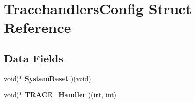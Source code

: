 \hypertarget{struct_tracehandlers_config}{}\section{Tracehandlers\+Config Struct Reference}
\label{struct_tracehandlers_config}
\subsection*{Data Fields}
\begin{DoxyCompactItemize}
\item
\hypertarget{struct_tracehandlers_config_a8a207cd3094ad3179b990c1dd4be8417}{}\label{struct_tracehandlers_config_a8a207cd3094ad3179b990c1dd4be8417}
void($\ast$ {\bfseries System\+Reset} )(void)
\item
\hypertarget{struct_tracehandlers_config_a79e207c44e3900ab7c4140f6bbdf0c19}{}\label{struct_tracehandlers_config_a79e207c44e3900ab7c4140f6bbdf0c19}
void($\ast$ {\bfseries T\+R\+A\+C\+E\+\_\+\+Handler} )(int, int)
\end{DoxyCompactItemize}
